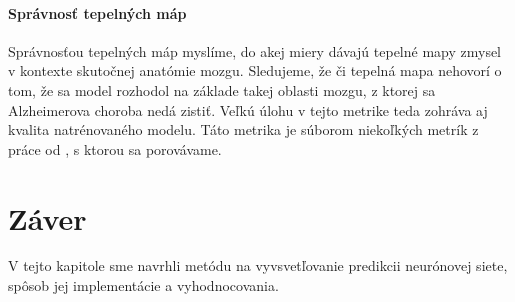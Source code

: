 \paragraph{Správnosť tepelných máp} Správnosťou tepelných máp myslíme, do akej miery dávajú tepelné mapy zmysel v kontexte skutočnej anatómie mozgu. Sledujeme, že či tepelná mapa nehovorí o tom, že sa model rozhodol na základe takej oblasti mozgu, z ktorej sa Alzheimerova choroba nedá zistiť. Veľkú úlohu v tejto metrike teda zohráva aj kvalita natrénovaného modelu. Táto metrika je súborom niekoľkých metrík z práce od \citeauthor*{bohle2019layer}, s ktorou sa porovávame.


\section{Záver}

V tejto kapitole sme navrhli metódu na vyvsvetľovanie predikcii neurónovej siete, spôsob jej implementácie a vyhodnocovania.
